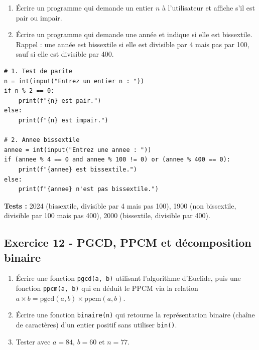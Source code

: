 \documentclass[12pt,a4paper]{article}
\begin{document}
\begin{boiteexercice}
\begin{enumerate}
  \item Écrire un programme qui demande un entier $n$ à l'utilisateur et affiche s'il est pair ou impair.
  \item Écrire un programme qui demande une année et indique si elle est bissextile. Rappel : une année est bissextile si elle est divisible par 4 mais pas par 100, sauf si elle est divisible par 400.
\end{enumerate}
\end{boiteexercice}

\begin{boitecorrige}
\begin{lstlisting}
# 1. Test de parite
n = int(input("Entrez un entier n : "))
if n % 2 == 0:
    print(f"{n} est pair.")
else:
    print(f"{n} est impair.")

# 2. Annee bissextile
annee = int(input("Entrez une annee : "))
if (annee % 4 == 0 and annee % 100 != 0) or (annee % 400 == 0):
    print(f"{annee} est bissextile.")
else:
    print(f"{annee} n'est pas bissextile.")
\end{lstlisting}

\textbf{Tests :} 2024 (bissextile, divisible par 4 mais pas 100), 1900 (non bissextile, divisible par 100 mais pas 400), 2000 (bissextile, divisible par 400).
\end{boitecorrige}

\subsection*{Exercice 12 - PGCD, PPCM et décomposition binaire \niveau{\moyen}}

\begin{boiteexercice}
\begin{enumerate}
  \item Écrire une fonction \texttt{pgcd(a, b)} utilisant l'algorithme d'Euclide, puis une fonction \texttt{ppcm(a, b)} qui en déduit le PPCM via la relation $a \times b = \mathrm{pgcd}(a,b) \times \mathrm{ppcm}(a,b)$.
  \item Écrire une fonction \texttt{binaire(n)} qui retourne la représentation binaire (chaîne de caractères) d'un entier positif sans utiliser \texttt{bin()}.
  \item Tester avec $a = 84$, $b = 60$ et $n = 77$.
\end{enumerate}
\end{boiteexercice}
\end{document}
